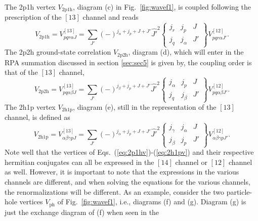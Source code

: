 \documentclass[twoside,12pt]{article}
\begin{document}
The 2p1h vertex $V_{\mathrm{2p1h}}$,
diagram (c) in  Fig.\  \ref{fig:wavef1},
is coupled
following the prescription of the $[13]$ channel and reads
\begin{equation}
      V_{\mathrm{2p1h}}=V_{pqr\alpha J}^{[13]}=
      {\displaystyle \sum_{J'}}(-)^{j_{\alpha}+j_p+J+J'}\hat{J'}^2
      \left\{
      \begin{array}{ccc}
       j_r&j_p&J\\j_q&j_{\alpha}&J'
      \end{array}
       \right\}
       V_{pqr\alpha J'}^{[12]}.
       \label{eq:2p1hv}
\end{equation}
The 2p2h ground-state correlation $V_{\mathrm{2p2h}}$, diagram (d),
 which will enter
in the RPA summation discussed in section \ref{sec:sec5} is given by,
the coupling order is that of the $[13]$ channel,
\begin{equation}
      V_{\mathrm{2p2h}}=V_{pq\alpha\beta J}^{[13]}=
      {\displaystyle \sum_{J'}}(-)^{j_{\beta}+j_p+J+J'}\hat{J'}^2
      \left\{
      \begin{array}{ccc}
       j_{\alpha}&j_p&J\\j_q&j_{\beta}&J'
      \end{array}
       \right\}
       V_{pq\alpha\beta J'}^{[12]}.
       \label{eq:2p2hv}
\end{equation}
The 2h1p vertex $V_{\mathrm{2h1p}}$, diagram (e),
still in the representation of
the $[13]$ channel, is defined as
\begin{equation}
      V_{\mathrm{2h1p}}=V_{\alpha\beta\gamma p J}^{[13]}=
      {\displaystyle \sum_{J'}}(-)^{j_{\alpha}+j_p+J+J'}\hat{J'}^2
      \left\{
      \begin{array}{ccc}
       j_{\gamma}&j_{\alpha}&J\\j_{\beta}&j_p&J'
      \end{array}
       \right\}
       V_{\alpha\beta\gamma p J'}^{[12]}.
       \label{eq:2h1pv}
\end{equation}
Note well that the vertices of Eqs.\ (\ref{eq:2p1hv})-(\ref{eq:2h1pv})
and their respective
hermitian conjugates can all be expressed in the $[14]$ channel
or $[12]$ channel as well.
However, it is important to note that the expressions in the various
channels are different, and when solving the equations for the various
channels, the renormalizations will be different. As an example, consider
the two particle-hole vertices $V_{\mathrm{ph}}$
of Fig.\ \ref{fig:wavef1}, i.e., diagrams (f) and (g).
Diagram (g) is just the exchange diagram of (f) when seen in the
\end{document}
